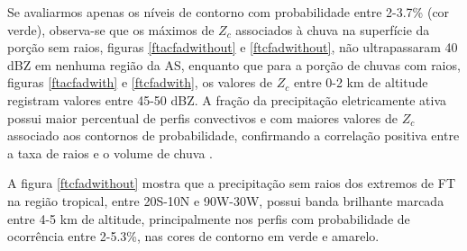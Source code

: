 


Se avaliarmos apenas os níveis de contorno com probabilidade entre 2-3.7\% (cor verde), observa-se que os máximos de $Z_c$ associados à chuva na superfície da porção sem raios, figuras \ref{ftacfadwithout} e \ref{ftcfadwithout}, não ultrapassaram 40 dBZ em nenhuma região da AS, enquanto que para a porção de chuvas com raios, figuras \ref{ftacfadwith} e \ref{ftcfadwith}, os valores de $Z_c$ entre 0-2 km de altitude registram valores entre 45-50 dBZ. A fração da precipitação eletricamente ativa possui maior percentual de perfis convectivos e com maiores valores de $Z_c$ associado aos contornos de probabilidade, confirmando a correlação positiva entre a taxa de raios e o volume de chuva \cite{Petersen1998}.




A figura \ref{ftcfadwithout} mostra que a precipitação sem raios dos extremos de FT na região tropical, entre 20S-10N e 90W-30W, possui banda brilhante marcada entre 4-5 km de altitude, principalmente nos perfis com probabilidade de ocorrência entre 2-5.3\%, nas cores de contorno em verde e amarelo. 

